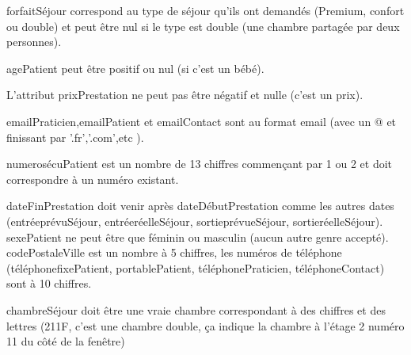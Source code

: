 \documentclass[12pt]{article}
\begin{document}
{\begin{adjustwidth}{20pt}{20pt}
    forfaitSéjour correspond au type de séjour qu'ils ont demandés (Premium, confort ou double) et peut être nul si le type est double (une chambre partagée par deux personnes).\bigskip
    
    agePatient peut être positif ou nul (si c'est un bébé).\bigskip

    L'attribut prixPrestation ne peut pas être négatif et nulle (c'est un prix).\bigskip
    
    emailPraticien,emailPatient et emailContact sont au format email (avec un @ et finissant par '.fr','.com',etc ).\bigskip
    
    numerosécuPatient est un nombre de 13 chiffres commençant par 1 ou 2 et doit correspondre à un numéro existant.\bigskip
    
    dateFinPrestation doit venir après dateDébutPrestation comme les autres dates (entréeprévuSéjour, entréeréelleSéjour, sortieprévueSéjour, sortieréelleSéjour).\bigskip
    sexePatient ne peut être que féminin ou masculin (aucun autre genre accepté).\bigskip
    codePostaleVille est un nombre à 5 chiffres, les numéros de téléphone (téléphonefixePatient, portablePatient, téléphonePraticien, téléphoneContact) sont à 10 chiffres.\bigskip
    
    chambreSéjour doit être une vraie chambre correspondant à des chiffres et des lettres (211F, c'est une chambre double, ça indique la chambre à l'étage 2 numéro 11 du côté de la fenêtre)
    \end{adjustwidth}
    }
\end{document}

